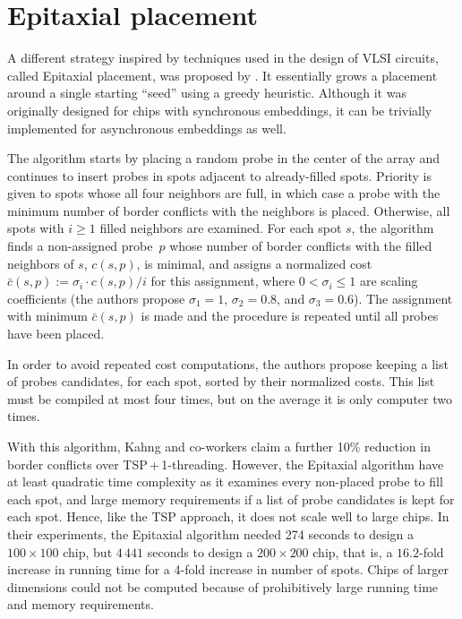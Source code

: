 \section{Epitaxial placement}
\label{sec:placement_epitaxial}

A different strategy inspired by techniques used in the design of VLSI circuits,
called Epitaxial placement, was proposed by \citet{Kahng2002}. It essentially
grows a placement around a single starting ``seed'' using a greedy heuristic.
Although it was originally designed for chips with synchronous embeddings, it
can be trivially implemented for asynchronous embeddings as well.

The algorithm starts by placing a random probe in the center of the array and
continues to insert probes in spots adjacent to already-filled spots. Priority
is given to spots whose all four neighbors are full, in which case a probe with
the minimum number of border conflicts with the neighbors is placed. Otherwise,
all spots with $i \geq 1$ filled neighbors are examined. For each spot $s$, the
algorithm finds a non-assigned probe~$p$ whose number of border conflicts with
the filled neighbors of $s$, $c(s,p)$, is minimal, and assigns a normalized cost
$\bar{c}(s,p) := \sigma_i \cdot c(s,p) / i$ for this assignment, where
$0 < \sigma_i \leq 1$ are scaling coefficients (the authors propose
$\sigma_1 = 1$, $\sigma_2 = 0.8$, and $\sigma_3 = 0.6$). The assignment with
minimum $\bar{c}(s,p)$ is made and the procedure is repeated until all probes
have been placed.

In order to avoid repeated cost computations, the authors propose keeping a list
of probes candidates, for each spot, sorted by their normalized costs. This list
must be compiled at most four times, but on the average it is only computer two
times.

With this algorithm, Kahng and co-workers claim a further 10\% reduction in
border conflicts over TSP\,+\,1-threading. However, the Epitaxial algorithm have
at least quadratic time complexity as it examines every non-placed probe to fill
each spot, and large memory requirements if a list of probe candidates is kept
for each spot. Hence, like the TSP approach, it does not scale well to large
chips. In their experiments, the Epitaxial algorithm needed 274 seconds to
design a $100\times 100$ chip, but $4\,441$ seconds to design a $200\times 200$
chip, that is, a $16.2$-fold increase in running time for a 4-fold increase in
number of spots. Chips of larger dimensions could not be computed because of
prohibitively large running time and memory requirements.

